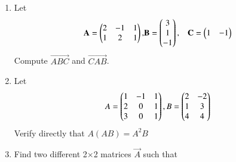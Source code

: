 \renewcommand{\theequation}{\theenumi}
\renewcommand{\thefigure}{\theenumi}
\begin{enumerate}[label=\thesubsection.\arabic*.,ref=\thesubsection.\theenumi]
%
\item Let 
\begin{align}
\mathbf{A} = \begin{pmatrix}2&-1&1\\1&2&1\end{pmatrix},
& \mathbf{B}= \begin{pmatrix}3\\1\\-1\end{pmatrix},
& \mathbf{C}=\begin{pmatrix}1&-1\end{pmatrix}
\end{align}
Compute $\vec{ABC}$ and $\vec{CAB}$.
%
\\
%
\solution

\item Let
\begin{align}
   A=\begin{pmatrix}1&-1&1\\2&0&1\\3&0&1\end{pmatrix}, B=\begin{pmatrix}2&-2\\1&3\\4&4\end{pmatrix}
\end{align}
Verify directly that $ A(AB)=A^2B $
%
\solution

%

%
\item Find two different 2$\times$2 matrices $\vec{A}$ such that 


\end{enumerate}
